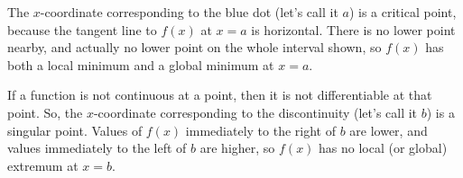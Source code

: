 \begin{solution}
\begin{center}\end{center}
The $x$-coordinate corresponding to the blue dot (let's call it $a$) is a critical point, because the tangent line to $f(x)$ at $x=a$ is horizontal. There is no lower point nearby, and actually no lower point on the whole interval shown, so $f(x)$ has both a local minimum and  a global minimum at $x=a$.

If a function is not continuous at a point, then it is not differentiable at that point. So, the $x$-coordinate  corresponding to the discontinuity (let's call it $b$) is a singular point. Values of $f(x)$ immediately to the right of $b$ are lower, and values immediately to the left of $b$ are higher, so $f(x)$ has no local (or global) extremum at $x=b$.
\end{solution}


